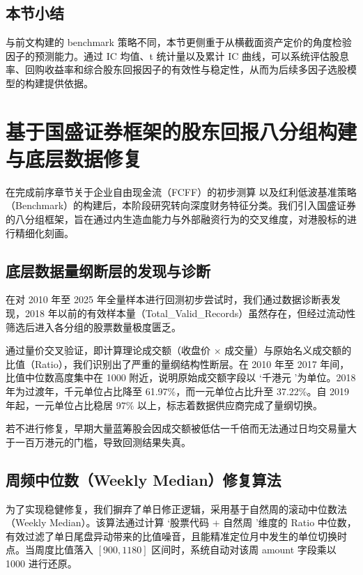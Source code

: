 \documentclass[a4paper,10pt]{article}
\begin{document}
\subsection{本节小结}

与前文构建的 benchmark 策略不同，本节更侧重于从横截面资产定价的角度检验因子的预测能力。通过 IC 均值、t 统计量以及累计 IC 曲线，可以系统评估股息率、回购收益率和综合股东回报因子的有效性与稳定性，从而为后续多因子选股模型的构建提供依据。




\section{基于国盛证券框架的股东回报八分组构建与底层数据修复}

在完成前序章节关于企业自由现金流（FCFF）的初步测算 以及红利低波基准策略（Benchmark）的构建后，本阶段研究转向深度财务特征分类。我们引入国盛证券的八分组框架，旨在通过内生造血能力与外部融资行为的交叉维度，对港股标的进行精细化刻画。

\subsection{底层数据量纲断层的发现与诊断}

在对 2010 年至 2025 年全量样本进行回测初步尝试时，我们通过数据诊断表发现，2018 年以前的有效样本量（Total\_Valid\_Records）虽然存在，但经过流动性筛选后进入各分组的股票数量极度匮乏。

通过量价交叉验证，即计算理论成交额（收盘价 $\times$ 成交量）与原始名义成交额的比值（Ratio），我们识别出了严重的量纲结构性断层。在 2010 年至 2017 年间，比值中位数高度集中在 1000 附近，说明原始成交额字段以 \lq 千港元 \rq 为单位。2018 年为过渡年，千元单位占比降至 61.97\%，而一元单位占比升至 37.22\%。自 2019 年起，一元单位占比稳居 97\% 以上，标志着数据供应商完成了量纲切换。

若不进行修复，早期大量蓝筹股会因成交额被低估一千倍而无法通过日均交易量大于一百万港元的门槛，导致回测结果失真。

\subsection{周频中位数（Weekly Median）修复算法}

为了实现稳健修复，我们摒弃了单日修正逻辑，采用基于自然周的滚动中位数法（Weekly Median）。该算法通过计算 \lq 股票代码 + 自然周 \rq 维度的 Ratio 中位数，有效过滤了单日尾盘异动带来的比值噪音，且能精准定位月中发生的单位切换时点。当周度比值落入 $[900, 1180]$ 区间时，系统自动对该周 amount 字段乘以 1000 进行还原。
\end{document}
